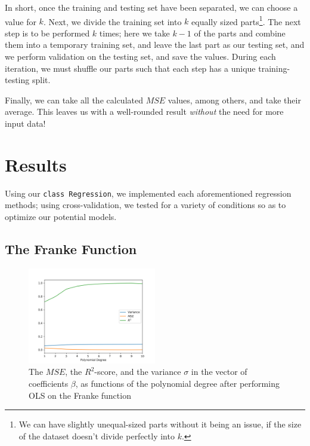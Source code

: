 \documentclass[a4paper,10pt,english]{article}
\begin{document}
In short, once the training and testing set have been separated, we can choose a value for $k$.  Next, we divide the training set into $k$ equally sized parts\footnote{We can have slightly unequal-sized parts without it being an issue, if the size of the dataset doesn't divide perfectly into $k$.}.  The next step is to be performed $k$ times; here we take $k-1$ of the parts and combine them into a temporary training set, and leave the last part as our testing set, and we perform validation on the testing set, and save the values.  During each iteration, we must shuffle our parts such that each step has a unique training-testing split.

Finally, we can take all the calculated $MSE$ values, among others, and take their average.  This leaves us with a well-rounded result \textit{without} the need for more input data!

\section*{Results}
\label{sec:results}

Using our \texttt{class Regression}, we implemented each aforementioned regression methods; using cross-validation, we tested for a variety of conditions so as to optimize our potential models. 

\subsection*{The Franke Function}

\begin{figure}[H]
	\centering  
	\includegraphics[width = 0.5\textwidth, center]{../franke_output/part_A.png}
	\caption{The $MSE$, the $R^2$-score, and the variance $\sigma$ in the vector of coefficients $\beta$, as functions of the polynomial degree after performing OLS on the Franke function}
	\label{fig_4}
\end{figure}
\end{document}
